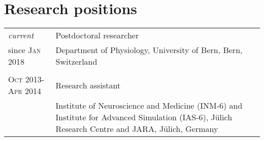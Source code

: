 \section{Research positions}
\begin{longtable}{>{\hfill}p{3.15cm}|p{10.4cm}}
\emph{current} & Postdoctoral researcher \\
since \textsc{Jan 2018}& \footnotesize Department of Physiology, University of Bern, Bern, Switzerland \\
  \multicolumn{2}{c}{} \\
\textsc{Oct} 2013-\textsc{Apr} 2014 & Research assistant \\
& \footnotesize Institute of Neuroscience and Medicine (INM-6) and Institute for Advanced Simulation (IAS-6), J\"ulich Research Centre and JARA, J\"ulich, Germany\\
\end{longtable}

